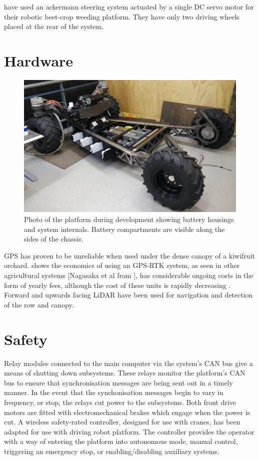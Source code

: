 \documentclass[preprint,authoryear,12pt]{elsarticle}
\begin{document}
    \citep{Astrand2002} have used an ackermann steering system actuated by a single DC servo motor for their robotic beet-crop weeding platform. They have only two driving wheels placed at the rear of the system.


\section{Hardware}
\label{sect:hardware}

    \begin{figure}[htbp]
        \centering
        \includegraphics[width=\linewidth]{imgs/photos/development_wBatteryBoxes.jpg}
        \caption{
            Photo of the platform during development showing battery housings and system internals.
            Battery compartments are visible along the sides of the chassis.
        }
        \label{fig:AMMP}
    \end{figure}

    GPS has proven to be unreliable when used under the dense canopy of a kiwifruit orchard.
    \citep{Pedersen2006} shows the economics of using an GPS-RTK system, as seen in other agricultural systems \citep{Bak2004,Ruckelshausen2009}[Nagasaka et al from \citep{Torii2000}], has considerable ongoing costs in the form of yearly fees, although the cost of these units is rapidly decreasing \citep{Torii2000}.
    Forward and upwards facing LiDAR have been used for navigation and detection of the row and canopy.

\section{Safety}
\label{sect:safety}
    Relay modules connected to the main computer via the system's CAN bus give a means of shutting down subsystems.
    These relays monitor the platform's CAN bus to ensure that synchronisation messages are being sent out in a timely manner.
    In the event that the synchonisation messages begin to vary in frequency, or stop, the relays cut power to the subsystems.
    Both front drive motors are fitted with electromechanical brakes which engage when the power is cut.
    A wireless safety-rated controller, designed for use with cranes, has been adapted for use with driving robot platform.
    The controller provides the operator with a way of entering the platform into autonomous mode, manual control, triggering an emergency stop, or enabling/disabling auxiliary systems.
\end{document}

